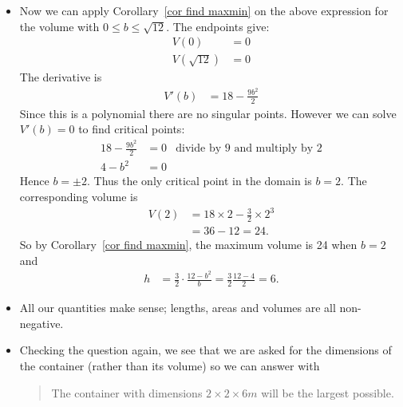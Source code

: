 \begin{eg}
\begin{itemize}
\item Now we can apply Corollary~\ref{cor find maxmin} on the above expression for
the volume with $0 \leq b \leq \sqrt{12}$. The endpoints give:
\begin{align*}
  V(0) &= 0 \\
  V(\sqrt{12}) &= 0
\end{align*}
The derivative is
\begin{align*}
  V'(b) &= 18 - \frac{9b^2}{2}
\end{align*}
Since this is a polynomial there are no singular points. However we can solve $V'(b) = 0$
to find critical points:
\begin{align*}
  18 - \frac{9b^2}{2} &= 0  & \text{divide by 9 and multiply by 2}\\
  4 - b^2 &= 0
\end{align*}
Hence $b = \pm 2$. Thus the only critical point in the domain is $b=2$. The corresponding
volume is
\begin{align*}
V(2) &= 18\times2 - \frac{3}{2} \times 2^3 \\
  &= 36 - 12 = 24.
\end{align*}
So by Corollary~\ref{cor find maxmin}, the maximum volume is 24 when $b=2$ and
\begin{align*}
  h &= \frac{3}{2} \cdot \frac{12-b^2}{b} = \frac{3}{2} \frac{12-4}{2} = 6.
\end{align*}
\item All our quantities make sense; lengths, areas and volumes are all non-negative.
\item Checking the question again, we see that we are asked for the dimensions of the
container (rather than its volume) so we can answer with
\begin{quote}
 The container with dimensions $2 \times 2 \times 6m$ will be the largest possible.
\end{quote}
\end{itemize}
\end{eg}


